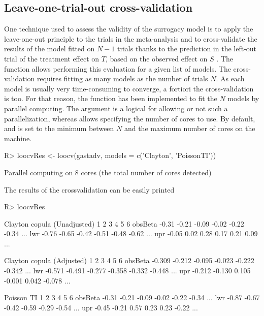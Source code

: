 \documentclass[article,shortnames, nojss]{jss}\usepackage[]{graphicx}\usepackage[]{color}
\begin{document}
\subsection{Leave-one-trial-out cross-validation}
One technique used to assess the validity of the surrogacy model
  is to apply the leave-one-out principle to the trials in the meta-analysis
  and to cross-validate the results of the model fitted on
  $N-1$ trials thanks to the prediction in the left-out trial
  of the treatment effect on $T$, based on the observed effect on $S$
\citep{Michiels09, Mauguen13, Rotolo17}.
The function  allows performing this evaluation for
  a given list of models.
The cross-validation requires fitting as many models as the number of trials $N$.
As each model is usually very time-consuming to converge,
  a fortiori the cross-validation is too.
For that reason, the function  has been implemented to
  fit the $N$ models by parallel computing.
The argument  is a logical for allowing or not such a parallelization,
  whereas  allows specifying the number of cores to use.
By default,  and  is set to the minimum
  between $N$ and the maximum number of cores on the machine.
\begin{Schunk}
\begin{Sinput}
R>   loocvRes <- loocv(gastadv, models = c('Clayton', 'PoissonTI'))
\end{Sinput}
\begin{Soutput}
Parallel computing on 8 cores (the total number of cores detected)
\end{Soutput}
\end{Schunk}
The results of the crossvalidation can be easily printed
\begin{Schunk}
\begin{Sinput}
R>   loocvRes
\end{Sinput}
\begin{Soutput}

   Clayton copula (Unadjusted) 
        1     2     3     4     5     6        
obsBeta -0.31 -0.21 -0.09 -0.02 -0.22 -0.34 ...
lwr     -0.76 -0.65 -0.42 -0.51 -0.48 -0.62 ...
upr     -0.05  0.02  0.28  0.17  0.21  0.09 ...

   Clayton copula (Adjusted) 
        1      2      3      4      5      6         
obsBeta -0.309 -0.212 -0.095 -0.023 -0.222 -0.342 ...
lwr     -0.571 -0.491 -0.277 -0.358 -0.332 -0.448 ...
upr     -0.212 -0.130  0.105 -0.001  0.042 -0.078 ...

   Poisson TI 
        1     2     3     4     5     6        
obsBeta -0.31 -0.21 -0.09 -0.02 -0.22 -0.34 ...
lwr     -0.87 -0.67 -0.42 -0.59 -0.29 -0.54 ...
upr     -0.45 -0.21  0.57  0.23  0.23 -0.22 ...
\end{Soutput}
\end{Schunk}
\end{document}
